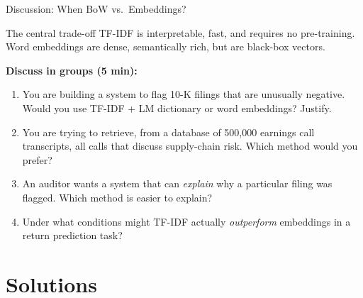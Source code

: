 \documentclass[9pt,t]{beamer}
\begin{document}
\begin{frame}{Discussion: When BoW vs.\ Embeddings?}
  \begin{block}{The central trade-off}
    TF-IDF is interpretable, fast, and requires no pre-training.\\
    Word embeddings are dense, semantically rich, but are black-box vectors.
  \end{block}
  \medskip
  \textbf{Discuss in groups (5 min):}
  \begin{enumerate}
    \item You are building a system to flag 10-K filings that are unusually negative.
          Would you use TF-IDF + LM dictionary or word embeddings? Justify.
    \item You are trying to retrieve, from a database of 500,000 earnings call transcripts,
          all calls that discuss supply-chain risk. Which method would you prefer?
    \item An auditor wants a system that can \emph{explain} why a particular filing was
          flagged. Which method is easier to explain?
    \item Under what conditions might TF-IDF actually \emph{outperform} embeddings in
          a return prediction task?
  \end{enumerate}
\end{frame}

\section{Solutions}
\end{document}
